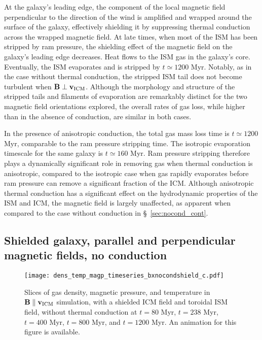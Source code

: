 \documentclass[twocolumn]{aastex6}
\begin{document}
At the galaxy's leading edge, the component of the local magnetic field perpendicular to the direction of the wind is amplified and wrapped around the surface of the galaxy, effectively shielding it by suppressing thermal conduction across the wrapped magnetic field. At late times, when most of the ISM has been stripped by ram pressure, the shielding effect of the magnetic field on the galaxy's leading edge decreases. Heat flows to the ISM gas in the galaxy's core. Eventually, the ISM evaporates and is stripped by $t \simeq 1200$ Myr. Notably, as in the case without thermal conduction, the stripped ISM tail does not become turbulent when $\mathbf{B} \perp \mathbf{v_{\rm ICM}}$. Although the morphology and structure of the stripped tails and filaments of evaporation are remarkably distinct for the two magnetic field orientations explored, the overall rates of gas loss, while higher than in the absence of conduction, are similar in both cases.

In the presence of anisotropic conduction, the total gas mass loss time is $t \simeq 1200 $ Myr, comparable to the ram pressure stripping time. The isotropic evaporation timescale for the same galaxy is $t \simeq 160 $ Myr. Ram pressure stripping therefore plays a dynamically significant role in removing gas when thermal conduction is anisotropic, compared to the isotropic case when gas rapidly evaporates before ram pressure can remove a significant fraction of the ICM. Although anisotropic thermal conduction has a significant effect on the hydrodynamic properties of the ISM and ICM, the magnetic field is largely unaffected, as apparent when compared to the case without conduction in \S~\ref{sec:nocond_cont}.

\subsection{Shielded galaxy, parallel and perpendicular magnetic fields, no conduction }
\label{sec:nocond_shield}

\begin{figure*}[!htbp]
  \begin{center}
    {\texttt{[image: dens\_temp\_magp\_timeseries\_bxnocondshield\_c.pdf]}}
     \caption{Slices of gas density, magnetic pressure, and temperature in $\mathbf{B} \parallel \mathbf{v_{\rm ICM}}$ simulation, with a shielded ICM field and toroidal ISM field, without thermal conduction at $t = 80$ Myr, $t = 238$ Myr, $t = 400$ Myr, $t = 800$ Myr, and $t = 1200$ Myr. An animation for this figure is available.\label{fig:bxnocondshield}}
  \end{center}  
\end{figure*}
\end{document}
